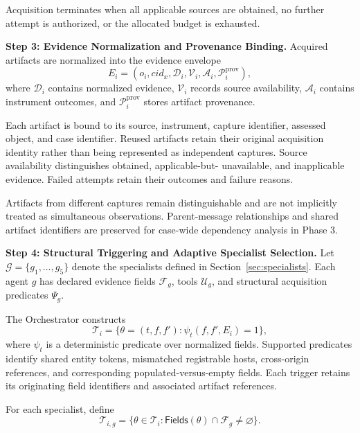 Acquisition terminates when all applicable
sources are obtained, no further attempt
is authorized, or the allocated budget
is exhausted.

\medskip
\noindent\textbf{Step 3: Evidence Normalization
and Provenance Binding.}
Acquired artifacts are normalized into
the evidence envelope
\begin{equation}
E_i=
(o_i,cid_x,\mathcal D_i,\mathcal V_i,
\mathcal A_i,\mathcal P_i^{\mathrm{prov}}),
\label{eq:evidence-envelope}
\end{equation}
where $\mathcal D_i$ contains normalized
evidence, $\mathcal V_i$ records source
availability, $\mathcal A_i$ contains
instrument outcomes, and
$\mathcal P_i^{\mathrm{prov}}$ stores
artifact provenance.

Each artifact is bound to its source,
instrument, capture identifier, assessed
object, and case identifier. Reused
artifacts retain their original acquisition
identity rather than being represented
as independent captures. Source availability
distinguishes obtained, applicable-but-
unavailable, and inapplicable evidence.
Failed attempts retain their outcomes
and failure reasons.

Artifacts from different captures remain
distinguishable and are not implicitly
treated as simultaneous observations.
Parent-message relationships and shared
artifact identifiers are preserved for
case-wide dependency analysis in Phase 3.

\medskip
\noindent\textbf{Step 4: Structural Triggering
and Adaptive Specialist Selection.}
Let $\mathcal G=\{g_1,\ldots,g_5\}$
denote the specialists defined in
Section~\ref{sec:specialists}. Each agent
$g$ has declared evidence fields
$\mathcal F_g$, tools $\mathcal U_g$,
and structural acquisition predicates
$\Psi_g$.

The Orchestrator constructs
\begin{equation}
\mathcal T_i=
\{\theta=(t,f,f'):
\psi_t(f,f',E_i)=1\},
\label{eq:structural-triggers}
\end{equation}
where $\psi_t$ is a deterministic
predicate over normalized fields.
Supported predicates identify shared
entity tokens, mismatched registrable
hosts, cross-origin references, and
corresponding populated-versus-empty
fields. Each trigger retains its
originating field identifiers and
associated artifact references.

For each specialist, define
\begin{equation}
\mathcal T_{i,g}=
\{\theta\in\mathcal T_i:
\mathsf{Fields}(\theta)
\cap\mathcal F_g\neq\varnothing\}.
\label{eq:agent-trigger-coverage}
\end{equation}

